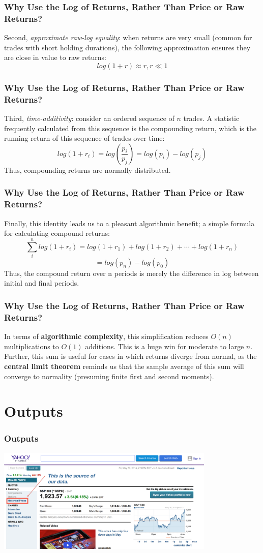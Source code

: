 \documentclass[mathserif]{beamer}
\begin{document}
\begin{frame}
\frametitle{Why Use the Log of Returns, Rather Than Price or Raw Returns?}
Second, {\em approximate raw-log equality}: when returns are very small (common for trades with short holding durations), the following approximation ensures they are close in value to raw returns:
\[log(1 + r) \approx r , r \ll 1 \]
\end{frame}

\begin{frame}
\frametitle{Why Use the Log of Returns, Rather Than Price or Raw Returns?}
Third, {\em time-additivity}: consider an ordered sequence of $n$ trades. A statistic frequently calculated from this sequence is the compounding return, which is the running return of this sequence of trades over time:
\[log(1 + r_i) = log(\frac{p_i}{p_j}) = log(p_i) - log(p_j) \]
Thus, compounding returns are normally distributed. 
\end{frame}

\begin{frame}
\frametitle{Why Use the Log of Returns, Rather Than Price or Raw Returns?}
Finally, this identity leads us to a pleasant algorithmic benefit; a simple formula for calculating compound returns:
\[\sum_{i}^n log(1+r_i) = log(1 + r_1) + log(1 + r_2)  + \cdots + log(1 + r_n) \] \[= log(p_n) - log(p_0)\]
Thus, the compound return over n periods is merely the difference in log between initial and final periods. 
\end{frame}

\begin{frame}
\frametitle{Why Use the Log of Returns, Rather Than Price or Raw Returns?}
In terms of {\bfseries algorithmic complexity}, this simplification reduces $O(n)$ multiplications to $O(1)$ additions. This is a huge win for moderate to large $n$. Further, this sum is useful for cases in which returns diverge from normal, as the {\bfseries central limit theorem} reminds us that the sample average of this sum will converge to normality (presuming finite first and second moments).
\end{frame}

\section{Outputs}
\begin{frame}
\frametitle{Outputs}
    \includegraphics[height=5cm]{5.png}
\end{frame}
\end{document}
